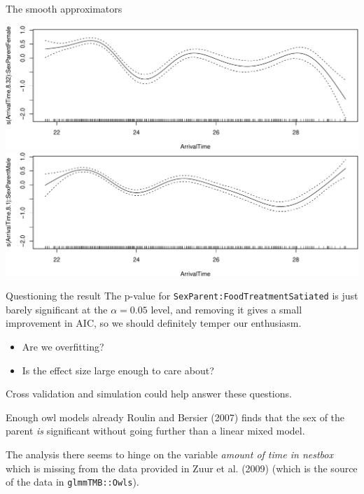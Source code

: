 \documentclass[
  ignorenonframetext,
]{beamer}
\newenvironment{Shaded}{\begin{snugshade}}{\end{snugshade}}
\newcommand{\FunctionTok}[1]{\textcolor[rgb]{0.00,0.00,0.00}{#1}}
\newcommand{\NormalTok}[1]{#1}
\newcommand{\SpecialCharTok}[1]{\textcolor[rgb]{0.00,0.00,0.00}{#1}}
\providecommand{\tightlist}{%
  \setlength{\itemsep}{0pt}\setlength{\parskip}{0pt}}
\begin{document}
\begin{frame}[fragile]{The smooth approximators}
\protect\hypertarget{the-smooth-approximators}{}
\begin{Shaded}
\end{Shaded}

\includegraphics{mixed_models_files/figure-beamer/unnamed-chunk-36-1.pdf}
\includegraphics{mixed_models_files/figure-beamer/unnamed-chunk-36-2.pdf}
\end{frame}

\begin{frame}[fragile]{Questioning the result}
\protect\hypertarget{questioning-the-result}{}
The p-value for \texttt{SexParent:FoodTreatmentSatiated} is just barely
significant at the \(\alpha=0.05\) level, and removing it gives a small
improvement in AIC, so we should definitely temper our enthusiasm.

\begin{itemize}
\tightlist
\item
  Are we overfitting?
\item
  Is the effect size large enough to care about?
\end{itemize}

Cross validation and simulation could help answer these questions.
\end{frame}

\begin{frame}[fragile]{Enough owl models already}
\protect\hypertarget{enough-owl-models-already}{}
Roulin and Bersier (2007) finds that the sex of the parent \emph{is}
significant without going further than a linear mixed model.

The analysis there seems to hinge on the variable \emph{amount of time
in nestbox} which is missing from the data provided in Zuur et al.
(2009) (which is the source of the data in \texttt{glmmTMB::Owls}).
\end{frame}
\end{document}
